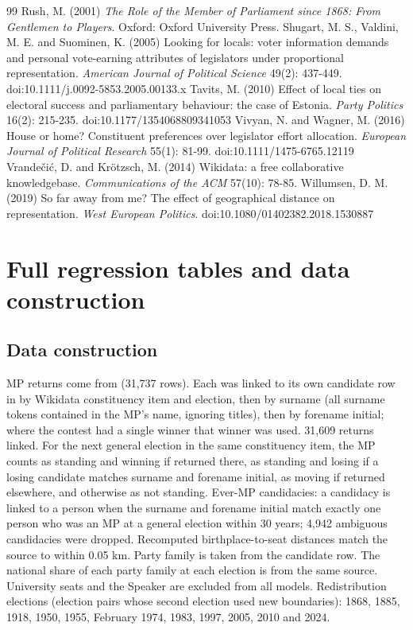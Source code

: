 \documentclass[11pt,a4paper]{article}
\begin{document}
\begin{thebibliography}{99}
 Rush, M. (2001) \textit{The Role of the Member of Parliament since 1868: From Gentlemen to Players}. Oxford: Oxford University Press.
 Shugart, M. S., Valdini, M. E. and Suominen, K. (2005) Looking for locals: voter information demands and personal vote-earning attributes of legislators under proportional representation. \textit{American Journal of Political Science} 49(2): 437-449. doi:10.1111/j.0092-5853.2005.00133.x
 Tavits, M. (2010) Effect of local ties on electoral success and parliamentary behaviour: the case of Estonia. \textit{Party Politics} 16(2): 215-235. doi:10.1177/1354068809341053
 Vivyan, N. and Wagner, M. (2016) House or home? Constituent preferences over legislator effort allocation. \textit{European Journal of Political Research} 55(1): 81-99. doi:10.1111/1475-6765.12119
 Vrande\v{c}i\'c, D. and Kr\"otzsch, M. (2014) Wikidata: a free collaborative knowledgebase. \textit{Communications of the ACM} 57(10): 78-85.
 Willumsen, D. M. (2019) So far away from me? The effect of geographical distance on representation. \textit{West European Politics}. doi:10.1080/01402382.2018.1530887
\end{thebibliography}

\appendix
\section{Full regression tables and data construction}
\subsection{Data construction}
MP returns come from \citet{hotham2026mpl} (31,737 rows). Each was linked to its own candidate row in \citet{hotham2026ele} by Wikidata constituency item and election, then by surname (all surname tokens contained in the MP's name, ignoring titles), then by forename initial; where the contest had a single winner that winner was used. 31,609 returns linked. For the next general election in the same constituency item, the MP counts as standing and winning if returned there, as standing and losing if a losing candidate matches surname and forename initial, as moving if returned elsewhere, and otherwise as not standing. Ever-MP candidacies: a candidacy is linked to a person when the surname and forename initial match exactly one person who was an MP at a general election within 30 years; 4,942 ambiguous candidacies were dropped. Recomputed birthplace-to-seat distances match the source to within 0.05 km. Party family is taken from the candidate row. The national share of each party family at each election is from the same source. University seats and the Speaker are excluded from all models. Redistribution elections (election pairs whose second election used new boundaries): 1868, 1885, 1918, 1950, 1955, February 1974, 1983, 1997, 2005, 2010 and 2024.
\end{document}
